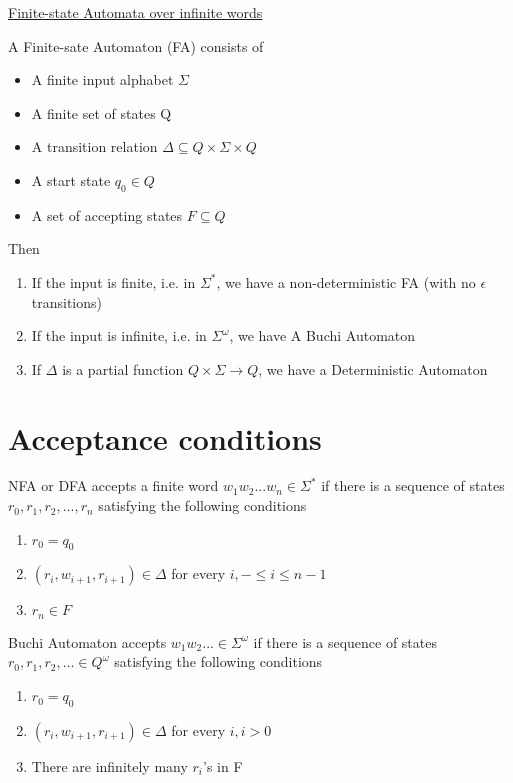 \documentclass{article}[18pt]
\begin{document}
\begin{center}
\underline{\huge Finite-state Automata over infinite words}
\end{center}
A Finite-sate Automaton (FA) consists of
\begin{itemize}
	\item A finite input alphabet $\Sigma$
	\item A finite set of states Q
	\item A transition relation $\Delta\subseteq Q\times \Sigma \times Q$
	\item A start state $q_0\in Q$
	\item A set of accepting states $F\subseteq Q$
\end{itemize}
Then
\begin{enumerate}
	\item If the input is finite, i.e. in $\Sigma^*$, we have a non-deterministic FA (with no $\epsilon$ transitions)
	\item If the input is infinite, i.e. in $\Sigma^\omega$, we have A Buchi Automaton
	\item If $\Delta$ is a partial function $Q\times \Sigma \rightarrow Q$, we have a Deterministic Automaton
\end{enumerate}
\section{Acceptance conditions}

\begin{minipage}{0.4\textwidth}
NFA or DFA accepts a finite word $w_1w_2...w_n\in \Sigma^*$ if there is a sequence of states $r_0,r_1,r_2,...,r_n$ satisfying the following conditions
\begin{enumerate}
	\item $r_0=q_0$
	\item $(r_i,w_{i+1},r_{i+1})\in \Delta$ for every $i,-\leqslant i\leqslant n-1$
	\item $r_n\in F$
\end{enumerate}
\end{minipage}
\begin{minipage}{0.1\textwidth}
\vline
\end{minipage}
\begin{minipage}{0.4\textwidth}
Buchi Automaton accepts $w_1w_2...\in \Sigma^\omega$ if there is a sequence of states $r_0, r_1,r_2,...\in Q^\omega$ satisfying the following conditions
\begin{enumerate}
	\item $r_0=q_0$
	\item $(r_i,w_{i+1},r_{i+1})\in \Delta$ for every $i,i>0$
	\item There are infinitely many $r_i$'s in F
\end{enumerate}
\end{minipage}
\end{document}
